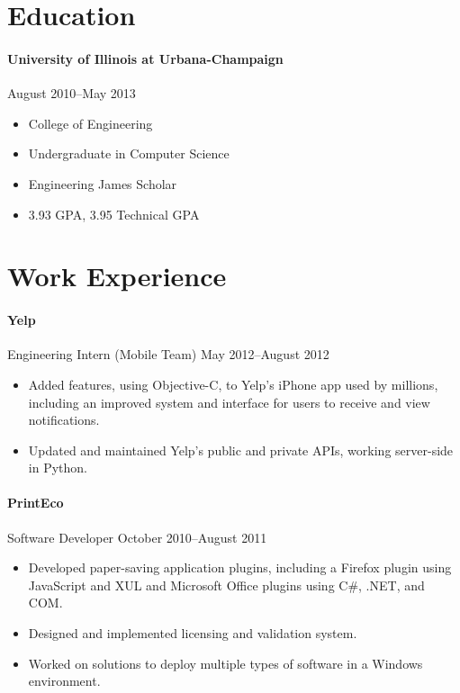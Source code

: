 \documentclass[letterpaper,12pt]{article}
\begin{document}
\section*{Education}
\paragraph{University of Illinois at Urbana-Champaign}
\hfill August 2010--May 2013
\begin{multicols}{2}
\begin{itemize}
\item College of Engineering
\item Undergraduate in Computer Science
\item Engineering James Scholar
\item 3.93 GPA, 3.95 Technical GPA
\end{itemize}
\end{multicols}

\section*{Work Experience}
\paragraph{Yelp}
Engineering Intern (Mobile Team) \hfill May 2012--August 2012
\begin{itemize}
\item Added features, using Objective-C,
to Yelp's iPhone app used by millions,
including an improved system and interface for users to
receive and view notifications.
\item Updated and maintained Yelp's public and private APIs,
working server-side in Python.
\end{itemize}

\paragraph{PrintEco}
Software Developer \hfill October 2010--August 2011
\begin{itemize}
\item Developed paper-saving application plugins,
including a Firefox plugin using JavaScript and XUL
and Microsoft Office plugins using C\#, .NET, and COM.
\item Designed and implemented licensing and validation system.
\item Worked on solutions to deploy multiple types of software
in a Windows environment.
\end{itemize}
\end{document}
